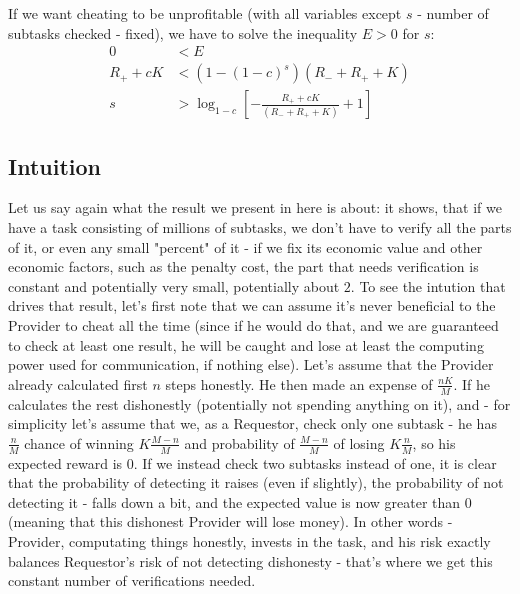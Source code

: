 \documentclass{winnower}
\begin{document}
If we want cheating to be unprofitable (with all variables except $s$ - number of 
subtasks checked - fixed), we have to solve the inequality $E > 0$ for $s$:
\begin{equation}
\begin{aligned}
0 &< E \\
R_{+} + cK &< (1 - (1 - c)^s)(R_{-} + R_{+} + K) \\
s &> \log_{1-c}[- \frac{R_{+} + cK}{(R_{-} + R_{+} + K)} + 1]
\end{aligned}
\end{equation}

\subsection{Intuition}
Let us say again what the result we present in here is about: it shows, that if we have a task consisting of millions of subtasks, we don't have to verify all the parts of it, or even any small "percent" of it - if we fix its economic value and other economic factors, such as the penalty cost, the part that needs verification is constant and potentially very small, potentially about $2$.
To see the intution that drives that result, let's first note that we can assume it's never beneficial to the Provider to cheat all the time (since if he would do that, and we are guaranteed to check at least one result, he will be caught and lose at least the computing power used for communication, if nothing else).
Let's assume that the Provider already calculated first $n$ steps honestly. He then made an expense of $\frac{nK}{M}$. If he calculates the rest dishonestly (potentially not spending anything on it), and - for simplicity let's assume that we, as a Requestor, check only one subtask - he has $\frac{n}{M}$ chance of winning $K\frac{M - n}{M}$ and probability of $\frac{M-n}{M}$ of losing $K\frac{n}{M}$, so his expected reward is $0$.
If we instead check two subtasks instead of one, it is clear that the probability of detecting it raises (even if slightly), the probability of not detecting it -  falls down a bit, and the expected value is now greater than $0$ (meaning that this dishonest Provider will lose money).
In other words - Provider, computating things honestly, invests in the task, and his risk exactly balances Requestor's risk of not detecting dishonesty - that's where we get this constant number of verifications needed.
\end{document}
